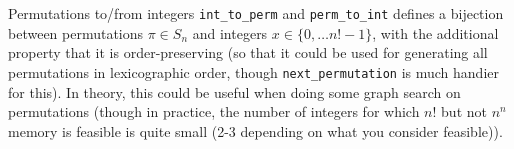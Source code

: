 \categorycontents{}


\begin{algorithm}{Permutations to/from integers}
\desc
{\tt int\_to\_perm} and {\tt perm\_to\_int} defines a bijection
between permutations $\pi \in S_n$ and integers $x \in \{0, \ldots
n!-1\}$, with the additional property that it is order-preserving (so
that it could be used for generating all permutations in lexicographic
order, though {\tt next\_permutation} is much handier for this).  In
theory, this could be useful when doing some graph search on
permutations (though in practice, the number of integers for which
$n!$ but not $n^n$ memory is feasible is quite small (2-3 depending on
what you consider feasible)).
\end{algorithm}


\begin{sourceslandscape}

\end{sourceslandscape}
